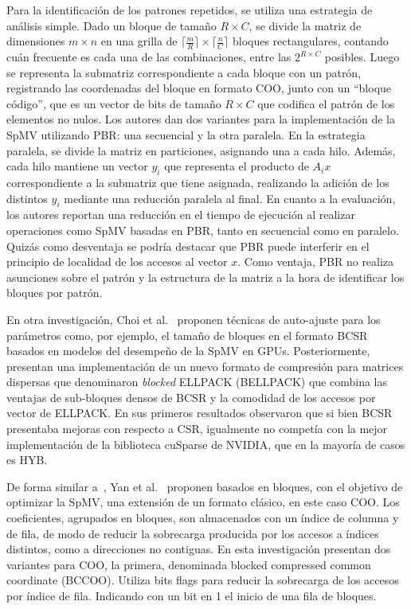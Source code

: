 Para la identificación de los patrones repetidos, se utiliza una estrategia de análisis simple. Dado un bloque de tamaño $R \times C$, se divide la matriz de dimensiones $m \times n$ en una grilla de $\lceil {\frac{m}{R}} \rceil \times \lceil{\frac{n}{C}}\rceil$ bloques rectangulares, contando cuán frecuente es cada una de las combinaciones, entre las $2^{R \times C}$ posibles. Luego se representa la submatriz correspondiente a cada bloque con un patrón, registrando las coordenadas del bloque en formato COO, junto con un ``bloque código'', que es un vector de bits de tamaño $R \times C$ que codifica el patrón de los elementos no nulos. Los autores dan dos variantes para la implementación de la SpMV utilizando PBR: una secuencial y la otra paralela. En la estrategia paralela, se divide la matriz en particiones, asignando una a cada hilo. Además, %
cada hilo mantiene un vector $y_{i}$ que representa el producto de $A_{i}x$ correspondiente a la submatriz que tiene asignada, realizando la adición de los distintos $y_i$ mediante una reducción paralela al final. 
En cuanto a la evaluación, los autores reportan una reducción en el tiempo de ejecución al realizar operaciones como SpMV basadas en PBR, tanto en secuencial como en paralelo.
Quizás como desventaja se podría destacar que PBR puede interferir en el principio de localidad de los accesos al vector $x$. Como ventaja, PBR no realiza asunciones sobre el patrón y la estructura de la matriz a la hora de identificar los bloques por patrón.

En otra investigación, Choi et al.~\cite{Choi2010} proponen técnicas de auto-ajuste para los parámetros como, por ejemplo, el tamaño de bloques en el formato BCSR basados en modelos del desempeño de la SpMV en GPUs. Posteriormente, presentan una implementación de un nuevo formato de compresión para matrices dispersas que denominaron \textit{blocked} ELLPACK (BELLPACK) que combina las ventajas de sub-bloques densos de BCSR y la comodidad de los accesos por vector de ELLPACK.
En sus primeros resultados observaron que si bien BCSR presentaba mejoras con respecto a CSR, igualmente no competía con la mejor implementación de la biblioteca cuSparse de NVIDIA, que en la mayoría de casos es HYB. 

De forma similar a~\cite{Choi2010}, Yan et al.~\cite{Yan2014} proponen basados en bloques, con el objetivo de optimizar la SpMV, una extensión de un formato clásico, en este caso COO. Los coeficientes, agrupados en bloques, son almacenados con un índice de columna y de fila, de modo de reducir la sobrecarga producida por los accesos a índices distintos, como a direcciones no contiguas. En esta investigación presentan dos variantes para COO, la primera, denominada blocked compressed common coordinate (BCCOO). 
Utiliza bits flags para reducir la sobrecarga de los accesos por índice de fila. Indicando con un bit en 1 el inicio de una fila de bloques.


